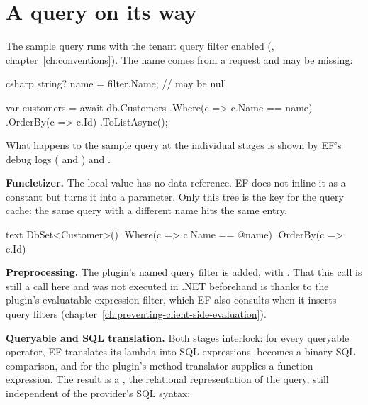 \section{A query on its way}

The sample query runs with the tenant query filter enabled
(,
chapter~\ref{ch:conventions}). The name comes from a request and may be missing:

\begin{sourcecode}[Application]{csharp}
string? name = filter.Name;                        // may be null

var customers = await db.Customers
    .Where(c => c.Name == name)
    .OrderBy(c => c.Id)
    .ToListAsync();
\end{sourcecode}

What happens to the sample query at the individual stages is shown by EF's debug logs
(
and ) and
.

\textbf{Funcletizer.} The local value  has no data reference. EF does not inline
it as a constant but turns it into a parameter. Only this tree is the key for the query
cache: the same query with a different name hits the same entry.

\begin{sourcecode}{text}
DbSet<Customer>()
    .Where(c => c.Name == @name)
    .OrderBy(c => c.Id)
\end{sourcecode}

\textbf{Preprocessing.} The plugin's named query filter is added, with
.
That this call is still a call here and was not executed in .NET beforehand is thanks to
the plugin's evaluatable expression filter, which EF also consults when it inserts query
filters (chapter~\ref{ch:preventing-client-side-evaluation}).

\textbf{Queryable and SQL translation.} Both stages interlock: for every queryable
operator, EF translates its lambda into SQL expressions. 
becomes a binary SQL comparison, and for
 the plugin's method translator supplies a
function expression. The result is a , the relational
representation of the query, still independent of the provider's SQL syntax:

